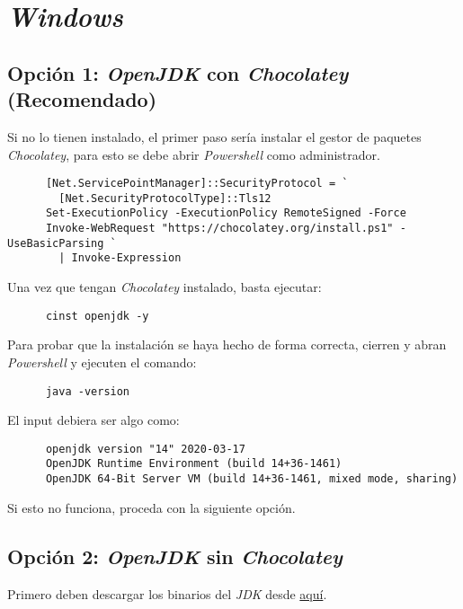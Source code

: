 \section{\textit{Windows}}
  \subsection{Opción 1: \textit{OpenJDK} con \textit{Chocolatey} (Recomendado)}
    \label{sec:java-choco}
    Si no lo tienen instalado, el primer paso sería instalar el gestor de paquetes 
    \textit{Chocolatey}, para esto se debe abrir \textit{Powershell} como 
    administrador.

    \begin{verbatim}
      [Net.ServicePointManager]::SecurityProtocol = `
        [Net.SecurityProtocolType]::Tls12
      Set-ExecutionPolicy -ExecutionPolicy RemoteSigned -Force
      Invoke-WebRequest "https://chocolatey.org/install.ps1" -UseBasicParsing `
        | Invoke-Expression
    \end{verbatim}

    Una vez que tengan \textit{Chocolatey} instalado, basta ejecutar:

    \begin{verbatim}
      cinst openjdk -y
    \end{verbatim}

    Para probar que la instalación se haya hecho de forma correcta, cierren y abran 
    \textit{Powershell} y ejecuten el comando:

    \begin{verbatim}
      java -version
    \end{verbatim}

    El input debiera ser algo como:

    \begin{verbatim}
      openjdk version "14" 2020-03-17
      OpenJDK Runtime Environment (build 14+36-1461)
      OpenJDK 64-Bit Server VM (build 14+36-1461, mixed mode, sharing)
    \end{verbatim}

    Si esto no funciona, proceda con la siguiente opción.

  \subsection{Opción 2: \textit{OpenJDK} sin \textit{Chocolatey}}
    Primero deben descargar los binarios del \textit{JDK} desde 
    \href{
      https://download.java.net/java/GA/jdk14/076bab302c7b4508975440c56f6cc26a/36/GPL/openjdk-14_windows-x64_bin.zip
      }{aquí}.
    
